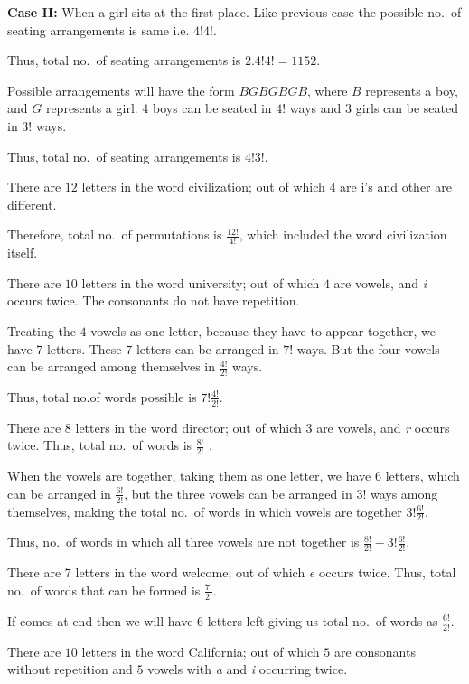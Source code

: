   {\bf Case II:} When a girl sits at the first place. Like previous case the possible no.\ of seating
  arrangements is same i.e. $4!4!$.

  Thus, total no.\ of seating arrangements is $2.4!4! = 1152$.
\item Possible arrangements will have the form $BGBGBGB$, where $B$ represents a boy, and $G$ represents a
  girl. $4$ boys can be seated in $4!$ ways and $3$ girls can be seated in $3!$ ways.

  Thus, total no.\ of seating arrangements is $4!3!$.
\item There are $12$ letters in the word civilization; out of which $4$ are i's and other are different.

  Therefore, total no.\ of permutations is $\frac{12!}{4!}$, which included the word civilization itself.
\item There are $10$ letters in the word university; out of which $4$ are vowels, and {\it i} occurs
  twice. The consonants do not have repetition.

  Treating the $4$ vowels as one letter, because they have to appear together, we have $7$ letters. These
  $7$ letters can be arranged in $7!$ ways. But the four vowels can be arranged among themselves in
  $\frac{4!}{2!}$ ways.

  Thus, total no.of words possible is $7!\frac{4!}{2!}$.
\item There are $8$ letters in the word director; out of which $3$ are vowels, and {\it r} occurs
  twice. Thus, total no.\ of words is $\frac{8!}{2!}$ .

  When the vowels are together, taking them as one letter, we have $6$ letters, which can be arranged in
  $\frac{6!}{2!}$, but the three vowels can be arranged in $3!$ ways among themselves, making the total
  no.\ of words in which vowels are together $3!\frac{6!}{2!}$.

  Thus, no.\ of words in which all three vowels are not together is $\frac{8!}{2!} - 3!\frac{6!}{2!}$.
\item There are $7$ letters in the word welcome; out of which {\it e} occurs twice. Thus, total no.\ of words
  that can be formed is $\frac{7!}{2!}$.

  If  comes at end then we will have $6$ letters left giving us total no.\ of words as
  $\frac{6!}{2!}$.
\item There are $10$ letters in the word California; out of which $5$ are consonants without repetition and
  $5$ vowels with {\it a} and {\it i} occurring twice.

